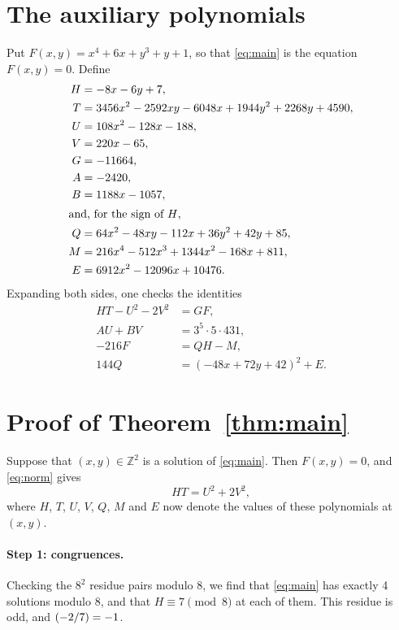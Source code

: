 \documentclass[11pt]{article}
\newcommand{\Z}{\mathbb{Z}}
\newcommand{\leg}[2]{\mathchoice{\biggl(\dfrac{#1}{#2}\biggr)}{(#1/#2)}{(#1/#2)}{(#1/#2)}}
\begin{document}
\section{The auxiliary polynomials}

Put $F(x,y)=x^{4}+6x+y^{3}+y+1$, so that \eqref{eq:main} is the equation $F(x,y)=0$. Define
\begin{align*}
H&=-8x-6y+7,\\
T&=3456x^{2}-2592xy-6048x+1944y^{2}+2268y+4590,\\
U&=108x^{2}-128x-188,\\
V&=220x-65,\\
G&=-11664,\\
A&=-2420,\\
B&=1188x-1057,\\
\intertext{and, for the sign of $H$,}
Q&=64x^{2}-48xy-112x+36y^{2}+42y+85,\\
M&=216x^{4}-512x^{3}+1344x^{2}-168x+811,\\
E&=6912x^{2}-12096x+10476.
\end{align*}
Expanding both sides, one checks the identities
\begin{align}
HT-U^2-2V^2&=GF,\label{eq:norm}\\
AU+BV&=3^{5}\cdot 5\cdot 431,\label{eq:bezout}\\
-216F&=QH-M,\label{eq:sign}\\
144Q&=(-48x+72y+42)^2+E.\label{eq:sign2}
\end{align}

\section{Proof of Theorem~\ref{thm:main}}

Suppose that $(x,y)\in\Z^2$ is a solution of \eqref{eq:main}. Then $F(x,y)=0$, and \eqref{eq:norm} gives
\begin{equation}\label{eq:HT}
HT=U^2+2V^2,
\end{equation}
where $H$, $T$, $U$, $V$, $Q$, $M$ and $E$ now denote the values of these polynomials at $(x,y)$.

\paragraph{Step 1: congruences.} Checking the $8^2$ residue pairs modulo $8$, we find that \eqref{eq:main} has exactly 4 solutions modulo $8$, and that $H\equiv7\pmod{8}$ at each of them. This residue is odd, and $\leg{-2}{7}=-1$.
\end{document}

